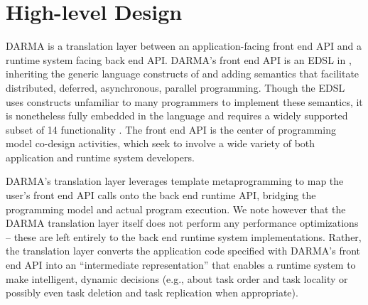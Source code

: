 \section{High-level Design}
\gls{DARMA} is a translation layer between an 
application-facing \gls{front end} \gls{API} and a \gls{runtime system} facing \gls{back end} 
\gls{API}. 
\gls{DARMA}'s \gls{front end} \gls{API} 
is an \gls{EDSL} in \CC,  inheriting the generic
language constructs of \CC and adding \gls{semantics} that facilitate
distributed, deferred, asynchronous, parallel programming. Though the \gls{EDSL} uses
\CC{} constructs unfamiliar to many programmers to implement these semantics, 
it is nonetheless fully embedded in the \CC{} language and
requires a widely supported subset of \CC{}14 functionality \compilerReqs.
The \gls{front end} \gls{API} is the center of \gls{programming model}
\gls{co-design} activities, which seek to involve a wide variety of both
application and \gls{runtime system} developers. 


\gls{DARMA}'s \gls{translation layer} leverages \CC{} \gls{template
metaprogramming} to map the user's \gls{front end} \gls{API} calls onto the \gls{back end} runtime \gls{API},
bridging the \gls{programming model} and actual program execution.
We note however that the \gls{DARMA} \gls{translation layer} itself does not
perform any performance optimizations -- these are left entirely to the \gls{back end} \gls{runtime system} implementations.
Rather, the translation layer converts the application code specified with
\gls{DARMA}'s \gls{front end} \gls{API} into
an ``intermediate representation'' that enables a \gls{runtime system} to make
intelligent, dynamic decisions (e.g., 
about task order and task locality or possibly even task deletion and task
replication when appropriate).

